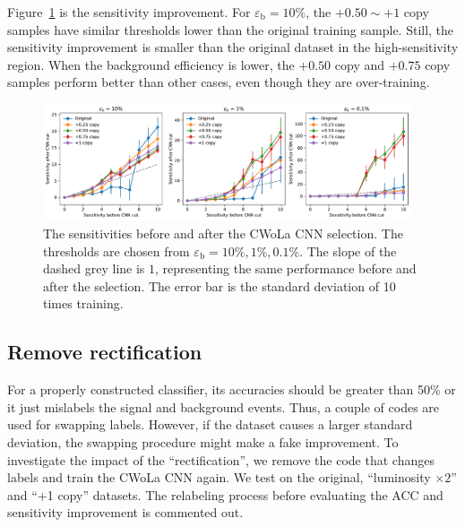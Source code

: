 \documentclass[12pt]{article}
\begin{document}
        Figure~\ref{fig:sensitivity_improvement_bkg_eff_copy_ratio} is the sensitivity improvement. For $\varepsilon_{\text{b}} = 10\%$, the $+0.50 \sim +1$ copy samples have similar thresholds lower than the original training sample. Still, the sensitivity improvement is smaller than the original dataset in the high-sensitivity region. When the background efficiency is lower, the $+ 0.50$ copy and $+ 0.75$ copy samples perform better than other cases, even though they are over-training.
        \begin{figure}[htpb]
            \centering
            \includegraphics[width=0.97\textwidth]{HVmodel_sensitivity_improvement_bkg_eff_copy_ratio.pdf}
            \caption{The sensitivities before and after the CWoLa CNN selection. The thresholds are chosen from $\varepsilon_{\text{b}} = 10\%, 1\%, 0.1\%$. The slope of the dashed grey line is $1$, representing the same performance before and after the selection. The error bar is the standard deviation of 10 times training.}
            \label{fig:sensitivity_improvement_bkg_eff_copy_ratio}
        \end{figure}
    \subsection{Remove rectification}%
    \label{sub:remove_rectification}
        For a properly constructed classifier, its accuracies should be greater than 50\% or it just mislabels the signal and background events.    Thus, a couple of codes are used for swapping labels. However, if the dataset causes a larger standard deviation, the swapping procedure might make a fake improvement. To investigate the impact of the ``rectification'', we remove the code that changes labels and train the CWoLa CNN again. We test on the original, ``luminosity $\times 2$'' and ``+1 copy'' datasets. The relabeling process before evaluating the ACC and sensitivity improvement is commented out.
\end{document}
